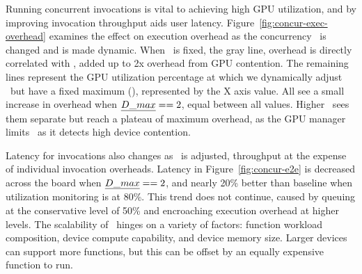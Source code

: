 Running concurrent invocations is vital to achieving high GPU utilization, and by improving invocation throughput aids user latency.
Figure~\ref{fig:concur-exec-overhead} examines the effect on execution overhead as the concurrency \D~is changed and is made dynamic.
When \D~is fixed, the gray line, overhead is directly correlated with \D, added up to 2x overhead from GPU contention.
The remaining lines represent the GPU utilization percentage at which we dynamically adjust \D~but have a fixed maximum (\Dmax), represented by the X axis value.
All see a small increase in overhead when $\emph{D\_max}==2$, equal between all values.
Higher \Dmax~sees them separate but reach a plateau of maximum overhead, as the GPU manager limits \D~as it detects high device contention.

Latency for invocations also changes as \D~is adjusted, throughput at the expense of individual invocation overheads.
Latency in Figure~\ref{fig:concur-e2e} is decreased across the board when $\emph{D\_max}==2$, and nearly 20\% better than baseline when utilization monitoring is at 80\%.
This trend does not continue, caused by queuing at the conservative level of 50\% and encroaching execution overhead at higher levels.
The scalability of \D~hinges on a variety of factors: function workload composition, device compute capability, and device memory size.
Larger devices can support more functions, but this can be offset by an equally expensive function to run.

